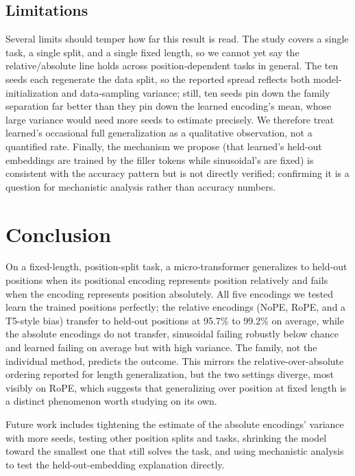 \documentclass{article}
\begin{document}
\subsection{Limitations}
Several limits should temper how far this result is read. The study covers a
single task, a single split, and a single fixed length, so we cannot yet say the
relative/absolute line holds across position-dependent tasks in general. The ten
seeds each regenerate the data split, so the reported spread reflects both
model-initialization and data-sampling variance; still, ten seeds pin down the
family separation far better than they pin down the learned encoding's mean, whose
large variance would need more seeds to estimate precisely. We therefore treat
learned's occasional full generalization as a qualitative observation, not a
quantified rate. Finally, the mechanism we propose (that learned's held-out
embeddings are trained by the filler tokens while sinusoidal's are fixed) is
consistent with the accuracy pattern but is not directly verified; confirming it is
a question for mechanistic analysis rather than accuracy numbers.

\section{Conclusion}

On a fixed-length, position-split task, a micro-transformer generalizes to
held-out positions when its positional encoding represents position relatively and
fails when the encoding represents position absolutely. All five encodings we
tested learn the trained positions perfectly; the relative encodings (NoPE, RoPE,
and a T5-style bias) transfer to held-out positions at 95.7\% to 99.2\% on average,
while the absolute encodings do not transfer, sinusoidal failing robustly below
chance and learned failing on average but with high variance. The family, not the
individual method, predicts the outcome. This mirrors the relative-over-absolute
ordering reported for length generalization, but the two settings diverge, most
visibly on RoPE, which suggests that generalizing over position at fixed length
is a distinct phenomenon worth studying on its own.

Future work includes tightening the estimate of the absolute encodings' variance
with more seeds, testing other position splits and tasks, shrinking the model
toward the smallest one that still solves the task, and using mechanistic analysis
to test the held-out-embedding explanation directly.
\end{document}
